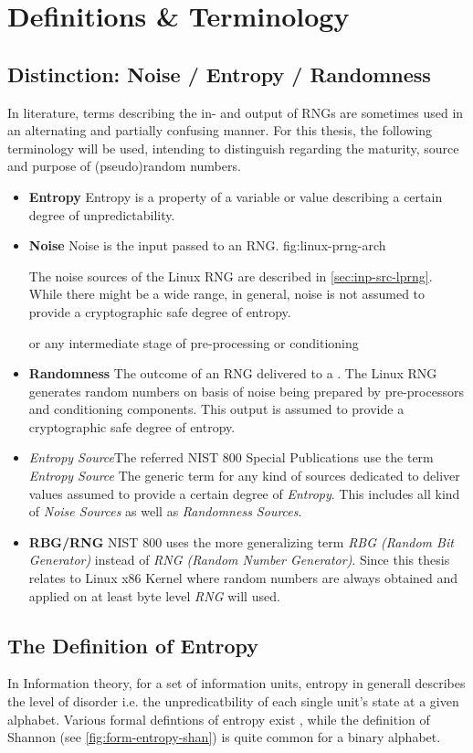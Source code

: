 \section{Definitions \& Terminology}

\subsection{Distinction: Noise / Entropy / Randomness}
In literature, terms describing the in- and output of RNGs are sometimes used in an alternating and partially confusing manner. For this thesis, the following terminology will be used, intending to distinguish regarding the maturity, source and purpose of (pseudo)random numbers.

\begin{itemize}
	\item \textbf{Entropy} Entropy is a property of a variable or value describing a certain degree of unpredictability. 
	\item \textbf{Noise} Noise is the input passed to an RNG. 
	{fig:linux-prng-arch}
	
	The noise sources of the Linux RNG are described in \ref{sec:inp-src-lprng}. While there might be a wide range, in general, noise is not assumed to provide a cryptographic safe degree of entropy. 
	
	or any intermediate stage of pre-processing or conditioning
	
	\item \textbf{Randomness} The outcome of an RNG delivered to a . The Linux RNG generates random numbers on basis of noise being prepared by pre-processors and conditioning components. This output is assumed to provide a cryptographic safe degree of entropy.  
	\item \textit{Entropy Source}The referred NIST 800 Special Publications use the term \textit{Entropy Source} The generic term for any kind of sources dedicated to deliver values assumed to provide a certain degree of \textit{Entropy}. This includes all kind of \textit{Noise Sources} as well as \textit{Randomness Sources}.	
	\item \textbf{RBG/RNG} NIST 800 uses the more generalizing term \textit{RBG (Random Bit Generator)} instead of \textit{RNG (Random Number Generator)}. Since this thesis relates to Linux x86 Kernel where random numbers are always obtained and applied on at least byte level \textit{RNG} will used.
\end{itemize}

\subsection{The Definition of Entropy}
In Information theory, for a set of information units, entropy in generall describes the level of disorder i.e. the unpredicatbility of each single unit's state at a given alphabet. Various formal defintions of entropy exist \cite{hagerty2012entropy}, while the definition of Shannon (see \ref{fig:form-entropy-shan}) is quite common for a binary alphabet. 

